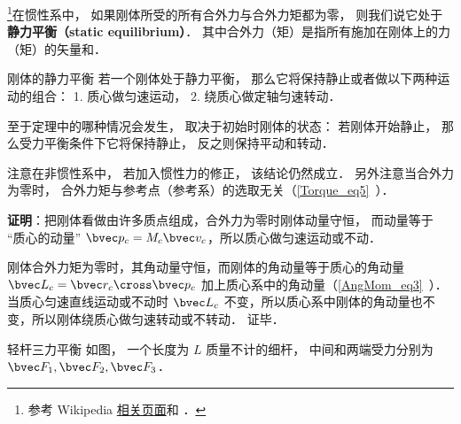 

\footnote{参考 Wikipedia \href{https://en.wikipedia.org/wiki/Mechanical_equilibrium}{相关页面}和 \cite{新力}．}在惯性系中， 如果刚体所受的所有合外力与合外力矩都为零， 则我们说它处于\textbf{静力平衡（static equilibrium）}． 其中合外力（矩）是指所有施加在刚体上的力（矩）的矢量和．

\begin{theorem}{刚体的静力平衡}
若一个刚体处于静力平衡， 那么它将保持静止或者做以下两种运动的组合： 1. 质心做匀速运动， 2. 绕质心做定轴匀速转动．
\end{theorem}
至于定理中的哪种情况会发生， 取决于初始时刚体的状态： 若刚体开始静止， 那么受力平衡条件下它将保持静止， 反之则保持平动和转动．

注意在非惯性系中， 若加入惯性力的修正， 该结论仍然成立． 另外注意当合外力为零时， 合外力矩与参考点（参考系）的选取无关（\autoref{Torque_eq5}~）．

\textbf{证明}：把刚体看做由许多质点组成，合外力为零时刚体动量守恒， 而动量等于 “质心的动量” 
$\bvec p_c = M_c \bvec v_c$，所以质心做匀速运动或不动．

刚体合外力矩为零时，其角动量守恒，而刚体的角动量等于质心的角动量 $\bvec L_c =\bvec r_c\cross \bvec p_c$ 加上质心系中的角动量（\autoref{AngMom_eq3}~）． 当质心匀速直线运动或不动时 $\bvec L_c$ 不变，所以质心系中刚体的角动量也不变，所以刚体绕质心做匀速转动或不转动． 证毕．

\begin{example}{轻杆三力平衡}
如图， 一个长度为 $L$ 质量不计的细杆， 中间和两端受力分别为 $\bvec F_1, \bvec F_2, \bvec F_3$．
\end{example}



